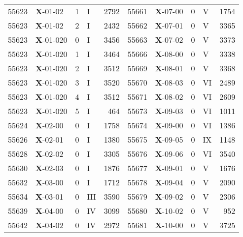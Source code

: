 \begin{table*}
\begin{tabular}{llllrllllr}
55623&\textbf{X}-01-02&1&I&2792&55661&\textbf{X}-07-00&0&V&1754\\
55623&\textbf{X}-01-02&2&I&2432&55662&\textbf{X}-07-01&0&V&3365\\
55623&\textbf{X}-01-020&0&I&3456&55663&\textbf{X}-07-02&0&V&3373\\
55623&\textbf{X}-01-020&1&I&3464&55666&\textbf{X}-08-00&0&V&3338\\
55623&\textbf{X}-01-020&2&I&3512&55669&\textbf{X}-08-01&0&V&3368\\
55623&\textbf{X}-01-020&3&I&3520&55670&\textbf{X}-08-03&0&VI&2489\\
55623&\textbf{X}-01-020&4&I&3512&55671&\textbf{X}-08-02&0&VI&2609\\
55623&\textbf{X}-01-020&5&I&464&55673&\textbf{X}-09-03&0&VI&1011\\
55624&\textbf{X}-02-00&0&I&1758&55674&\textbf{X}-09-00&0&VI&1386\\
55626&\textbf{X}-02-01&0&I&1380&55675&\textbf{X}-09-05&0&IX&1148\\
55628&\textbf{X}-02-02&0&I&3305&55676&\textbf{X}-09-06&0&VI&3540\\
55630&\textbf{X}-02-03&0&I&1876&55677&\textbf{X}-09-01&0&V&1676\\
55632&\textbf{X}-03-00&0&I&1712&55678&\textbf{X}-09-04&0&V&2090\\
55634&\textbf{X}-03-01&0&III&3590&55679&\textbf{X}-09-02&0&V&2306\\
55639&\textbf{X}-04-00&0&IV&3099&55680&\textbf{X}-10-02&0&V&952\\
55642&\textbf{X}-04-02&0&IV&2972&55681&\textbf{X}-10-00&0&V&3725\\
\hline
\hline
\end{tabular}
\end{table*}

